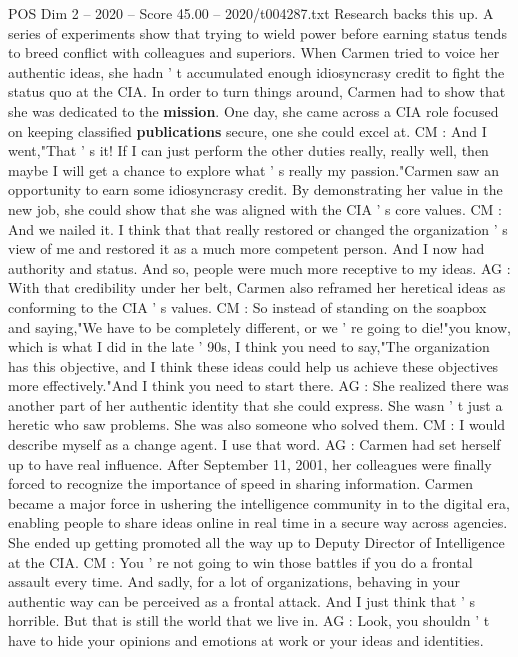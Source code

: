 \begin{textsample}{POS Dim 2 – 2020 – Score 45.00 – 2020/t004287.txt}
Research backs this up.
A series of experiments show that trying to wield power before earning status tends to breed conflict with colleagues and superiors.
When Carmen tried to voice her authentic ideas, she hadn ' t accumulated enough idiosyncrasy credit to fight the status quo at the CIA.
In order to turn things around, Carmen had to show that she was dedicated to the \textbf{mission}.
One day, she came across a CIA role focused on keeping classified \textbf{publications} secure, one she could excel at.
CM : And I went,"That ' s it!
If I can just perform the other duties really, really well, then maybe I will get a chance to explore what ' s really my passion."Carmen saw an opportunity to earn some idiosyncrasy credit.
By demonstrating her value in the new job, she could show that she was aligned with the CIA ' s core values.
CM : And we nailed it.
I think that that really restored or changed the organization ' s view of me and restored it as a much more competent person.
And I now had authority and status.
And so, people were much more receptive to my ideas.
AG : With that credibility under her belt, Carmen also reframed her heretical ideas as conforming to the CIA ' s values.
CM : So instead of standing on the soapbox and saying,"We have to be completely different, or we ' re going to die!"you know, which is what I did in the late ' 90s, I think you need to say,"The organization has this objective, and I think these ideas could help us achieve these objectives more effectively."And I think you need to start there.
AG : She realized there was another part of her authentic identity that she could express.
She wasn ' t just a heretic who saw problems.
She was also someone who solved them.
CM : I would describe myself as a change agent.
I use that word.
AG : Carmen had set herself up to have real influence.
After September 11, 2001, her colleagues were finally forced to recognize the importance of speed in sharing information.
Carmen became a major force in ushering the intelligence community in to the digital era, enabling people to share ideas online in real time in a secure way across agencies.
She ended up getting promoted all the way up to Deputy Director of Intelligence at the CIA.
CM : You ' re not going to win those battles if you do a frontal assault every time.
And sadly, for a lot of organizations, behaving in your authentic way can be perceived as a frontal attack.
And I just think that ' s horrible.
But that is still the world that we live in.
AG : Look, you shouldn ' t have to hide your opinions and emotions at work or your ideas and identities.

\end{textsample}
